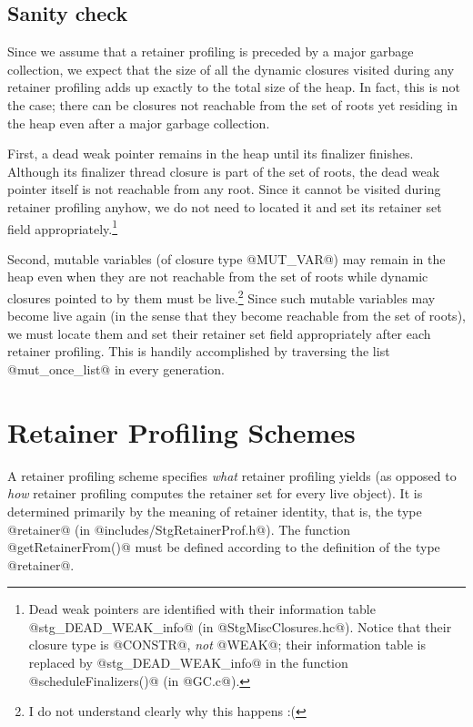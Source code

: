\documentclass{article}
\begin{document}
\subsection{Sanity check}

Since we assume that a retainer profiling is preceded by a major garbage
collection,
we expect that the size of all the dynamic closures visited during 
any retainer profiling adds up exactly to the total size of the heap.
In fact, this is not the case; there can be closures not reachable from
the set of roots yet residing in the heap even after a major garbage
collection.

First, a dead weak pointer remains in the heap until its finalizer
finishes. Although its finalizer thread closure is part of the set of roots,
the dead weak pointer itself is not reachable from any root.
Since it cannot be visited during retainer profiling anyhow, we do not
need to located it and set its retainer set field 
appropriately.\footnote{Dead weak pointers are identified with their 
information table @stg\_DEAD\_WEAK\_info@ (in @StgMiscClosures.hc@). 
Notice that their closure type is @CONSTR@, \emph{not} @WEAK@;
their information table is replaced by @stg\_DEAD\_WEAK\_info@ in the 
function @scheduleFinalizers()@ (in @GC.c@).} 

Second, 
mutable variables (of closure type @MUT_VAR@) may remain in the heap
even when they are not reachable from the set of roots while
dynamic closures pointed to by them must be live.\footnote{I do not 
understand clearly why this happens :(} 
Since such mutable variables may become live again (in the sense that
they become reachable from the set of roots), we must locate them
and set their retainer set field appropriately after each retainer
profiling. This is handily accomplished by traversing the list
@mut_once_list@ in every generation.

\section{Retainer Profiling Schemes}

A retainer profiling scheme specifies \emph{what} retainer profiling
yields (as opposed to \emph{how} retainer profiling computes the retainer
set for every live object).
It is determined primarily by the meaning of retainer identity,
that is, the type @retainer@ (in @includes/StgRetainerProf.h@). 
The function @getRetainerFrom()@ must be defined according to the
definition of the type @retainer@.
\end{document}
